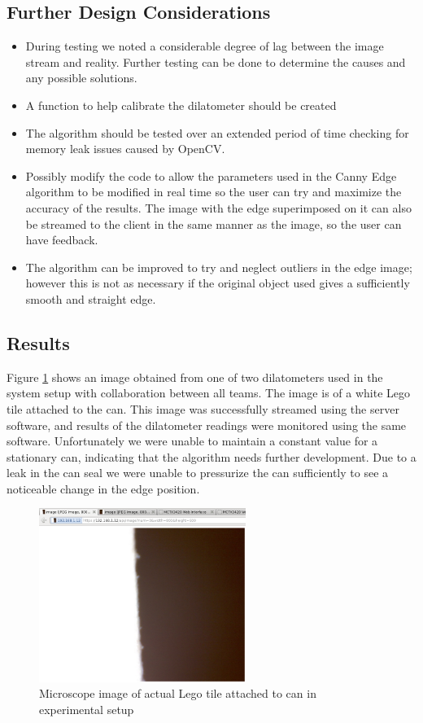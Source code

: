 \subsection{Further Design Considerations}

\begin{itemize}
	\item During testing we noted a considerable degree of lag between the image stream and reality. Further testing can be done to determine the causes and any possible solutions.
	\item A function to help calibrate the dilatometer should be created
	\item The algorithm should be tested over an extended period of time checking for memory leak issues caused by OpenCV.
	\item Possibly modify the code to allow the parameters used in the Canny Edge algorithm to be modified in real time so the user can try and maximize the accuracy of the results.  The image with the edge superimposed on it can also be streamed to the client in the same manner as the image, so the user can have feedback.

	\item The algorithm can be improved to try and neglect outliers in the edge image; however this is not as necessary if the original object used gives a sufficiently smooth and straight edge.
\end{itemize}

\subsection{Results}

Figure \ref{image_in_api.png} shows an image obtained from one of two dilatometers used in the system setup with collaboration between all teams. The image is of a white Lego tile attached to the can. This image was successfully streamed using the server software, and results of the dilatometer readings were monitored using the same software. Unfortunately we were unable to maintain a constant value for a stationary can, indicating that the algorithm needs further development. Due to a leak in the can seal we were unable to pressurize the can sufficiently to see a noticeable change in the edge position.

\begin{figure}[H]
	\centering
	\includegraphics[width=0.6\textwidth]{figures/image_in_api.png}
	\caption{Microscope image of actual Lego tile attached to can in experimental setup} 
	\label{image_in_api.png}
\end{figure}

